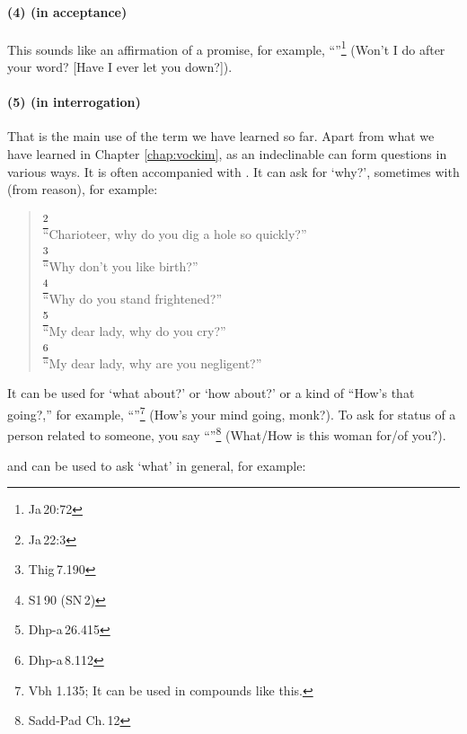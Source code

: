 \paragraph*{(4)  (in acceptance)} This sounds like an affirmation of a promise, for example, ``''\footnote{Ja\,20:72} (Won't I do after your word? [Have I ever let you down?]).

\paragraph*{(5)  (in interrogation)} That is the main use of the term we have learned so far. Apart from what we have learned in Chapter \ref{chap:vockim}, as an indeclinable  can form questions in various ways. It is often accompanied with . It can ask for `why?', sometimes with  (from reason), for example:

\begin{quote}
\footnote{Ja\,22:3} \\
``Charioteer, why do you dig a hole so quickly?'' \\[1.5mm]
\footnote{Thig\,7.190} \\
``Why don't you like birth?'' \\[1.5mm]
\footnote{S1\,90 (SN\,2)} \\
``Why do you stand frightened?'' \\[1.5mm]
\footnote{Dhp-a\,26.415} \\
``My dear lady, why do you cry?'' \\[1.5mm]
\footnote{Dhp-a\,8.112} \\
``My dear lady, why are you negligent?''
\end{quote}

It can be used for `what about?' or `how about?' or a kind of ``How's that going?,'' for example, ``''\footnote{Vbh 1.135; It can be used in compounds like this.} (How's your mind going, monk?). To ask for status of a person related to someone, you say ``''\footnote{Sadd-Pad Ch.\,12} (What/How is this woman for/of you?).

 and  can be used to ask `what' in general, for example:

